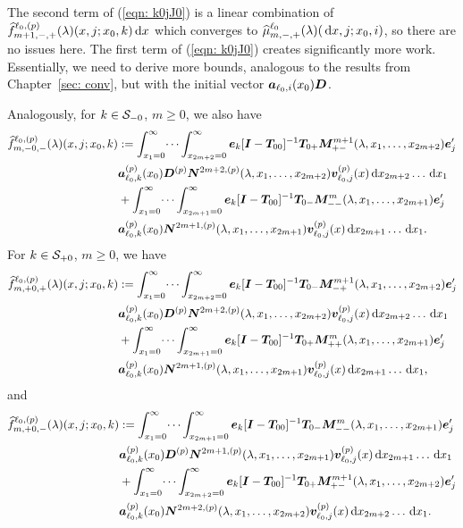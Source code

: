 The second term of (\ref{eqn: k0jJ0}) is a linear combination of \(\widehat{f}_{m+1,-,+}^{\ell_0,(p)}(\lambda)(x,j;x_0,k)\, \mathrm{d} x\) which converges to \(\widehat \mu_{m,-,+}^{\ell_0}(\lambda)(\, \mathrm{d} x,j;x_0,i)\), so there are no issues here. The first term of (\ref{eqn: k0jJ0}) creates significantly more work. Essentially, we need to derive more bounds, analogous to the results from Chapter~\ref{sec: conv}, but with the initial vector \(\boldsymbol a_{\ell_0,i}(x_0)\boldsymbol D\). 

Analogously, for \(k\in\mathcal{S}_{-0}\), \(m\geq 0\), we also have 
\begin{align*}
	\widehat{f}_{m,-0,-}^{\ell_0,(p)}(\lambda)(x,j;x_0,k)\nonumber 
	&:=\int_{x_1=0}^\infty \dots \int_{x_{2m+2}=0}^\infty  \boldsymbol e_k [\boldsymbol I - \boldsymbol T_{00}]^{-1}\boldsymbol T_{0+} \boldsymbol M^{m+1}_{+-}(\lambda,x_1,\dots,x_{2m+2})\boldsymbol e_j'{} \nonumber
	\\& \boldsymbol a_{\ell_0,k}^{(p)}(x_0) \boldsymbol D^{(p)} \boldsymbol N^{2m+2,(p)}(\lambda,x_1,\dots,x_{2m+2}) {\boldsymbol v}_{\ell_0,j}^{(p)}(x)\, \mathrm{d} x_{2m+2}\dots  \, \mathrm{d} x_1  \nonumber
	\\& + \int_{x_1=0}^\infty \dots \int_{x_{2m+1}=0}^\infty  \boldsymbol e_k [\boldsymbol I - \boldsymbol T_{00}]^{-1}\boldsymbol T_{0-} \boldsymbol M^{m}_{--}(\lambda,x_1,\dots,x_{2m+1})\boldsymbol e_j'{} \nonumber
	\\& \boldsymbol a_{\ell_0,k}^{(p)}(x_0)\boldsymbol N^{2m+1,(p)}(\lambda,x_1,\dots,x_{2m+1}) {\boldsymbol v}_{\ell_0,j}^{(p)}(x)\, \mathrm{d} x_{2m+1}\dots\, \mathrm{d} x_1.
\end{align*}
For \(k\in\mathcal{S}_{+0}\), \(m\geq 0\), we have 
\begin{align*}
	\widehat{f}_{m,+0,+}^{\ell_0,(p)}(\lambda)(x,j;x_0,k)\nonumber 
	&:=\int_{x_1=0}^\infty \dots \int_{x_{2m+2}=0}^\infty \boldsymbol e_k [\boldsymbol I - \boldsymbol T_{00}]^{-1}\boldsymbol T_{0-} \boldsymbol M^{m+1}_{-+}(\lambda,x_1,\dots,x_{2m+2})\boldsymbol e_j'{} \nonumber
	\\& \boldsymbol a_{\ell_0,k}^{(p)}(x_0) \boldsymbol D^{(p)} \boldsymbol N^{2m+2,(p)}(\lambda,x_1,\dots,x_{2m+2}) {\boldsymbol v}_{\ell_0,j}^{(p)}(x)\, \mathrm{d} x_{2m+2}\dots  \, \mathrm{d} x_1  \nonumber
	\\& + \int_{x_1=0}^\infty \dots \int_{x_{2m+1}=0}^\infty  \boldsymbol e_k [\boldsymbol I - \boldsymbol T_{00}]^{-1}\boldsymbol T_{0+} \boldsymbol M^m_{++}(\lambda,x_1,\dots,x_{2m+1})\boldsymbol e_j'{} \nonumber
	\\& \boldsymbol a_{\ell_0,k}^{(p)}(x_0)\boldsymbol N^{2m+1,(p)}(\lambda,x_1,\dots,x_{2m+1}) {\boldsymbol v}_{\ell_0,j}^{(p)}(x)\, \mathrm{d} x_{2m+1}\dots  \, \mathrm{d} x_1,
\end{align*}
and 
\begin{align*}
	\widehat{f}_{m,+0,-}^{\ell_0,(p)}(\lambda)(x,j;x_0,k)\nonumber 
	&:=\int_{x_1=0}^\infty \dots \int_{x_{2m+1}=0}^\infty  \boldsymbol e_k [\boldsymbol I - \boldsymbol T_{00}]^{-1}\boldsymbol T_{0-} \boldsymbol M^m_{--}(\lambda,x_1,\dots,x_{2m+1})\boldsymbol e_j'{} \nonumber
	\\& \boldsymbol a_{\ell_0,k}^{(p)}(x_0) \boldsymbol D^{(p)} \boldsymbol N^{2m+1,(p)}(\lambda,x_1,\dots,x_{2m+1}) {\boldsymbol v}_{\ell_0,j}^{(p)}(x)\, \mathrm{d} x_{2m+1}\dots  \, \mathrm{d} x_1  \nonumber
	\\& + \int_{x_1=0}^\infty \dots \int_{x_{2m+2}=0}^\infty  \boldsymbol e_k [\boldsymbol I - \boldsymbol T_{00}]^{-1}\boldsymbol T_{0+} \boldsymbol M^{m+1}_{+-}(\lambda,x_1,\dots,x_{2m+2})\boldsymbol e_j'{} \nonumber
	\\& \boldsymbol a_{\ell_0,k}^{(p)}(x_0)\boldsymbol N^{2m+2,(p)}(\lambda,x_1,\dots,x_{2m+2}) {\boldsymbol v}_{\ell_0,j}^{(p)}(x)\, \mathrm{d} x_{2m+2}\dots  \, \mathrm{d} x_1.
\end{align*}
